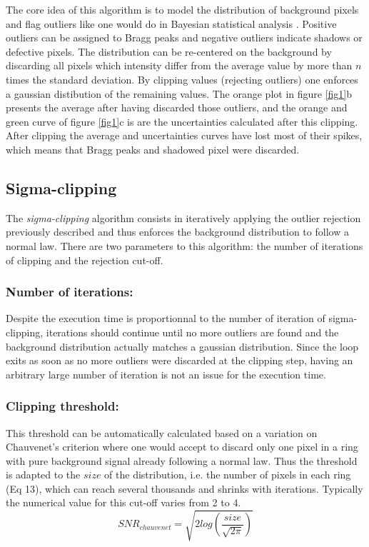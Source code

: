 \documentclass[preprint]{iucr}              %
\begin{document}
The core idea of this algorithm is to model the distribution of background pixels and flag outliers like one would do in Bayesian statistical analysis \cite{Sivia2006}. 
Positive outliers can be assigned to Bragg peaks and negative outliers indicate shadows or defective pixels. 
The distribution can be re-centered on the background by discarding all pixels which intensity differ from the average value by more than $n$ times the standard deviation.
By clipping values (rejecting outliers) one enforces a gaussian distibution of the remaining values.
The orange plot in figure \ref{fig1}b presents the average after having discarded those outliers, and the orange and green curve of figure \ref{fig1}c is are the uncertainties 
calculated after this clipping. 
 After clipping the average and uncertainties curves have lost most of their spikes, which means that Bragg peaks and shadowed pixel were discarded.
 
\subsection{Sigma-clipping}
The \textit{sigma-clipping} algorithm consists in iteratively applying the outlier rejection previously described and thus enforces 
the background distribution to follow a normal law.
There are two parameters to this algorithm: the number of iterations of clipping and the rejection cut-off.

\subsubsection{Number of iterations:}
Despite the execution time is proportionnal to the number of iteration of sigma-clipping, iterations should continue until no more outliers are found and the 
background distribution actually matches a gaussian distribution. 
Since the loop exits as soon as no more outliers were discarded at the clipping step, having an arbitrary large number of iteration is not an issue for the execution time.       

\subsubsection{Clipping threshold:}
This threshold can be automatically calculated based on a variation on Chauvenet's criterion \cite{chauvenet} where one would accept to discard only one pixel in a ring with pure
background signal already following a normal law. 
Thus the threshold is adapted to the $size$ of the distribution, i.e. the number of pixels in each ring (Eq 13), which can reach several thousands and shrinks with iterations.
Typically the numerical value for this cut-off varies from 2 to 4.   
\begin{equation}
SNR_{chauvenet} =  \sqrt{2 log(\frac{size}{\sqrt{2 \pi}})}
\end{equation}
\end{document}
